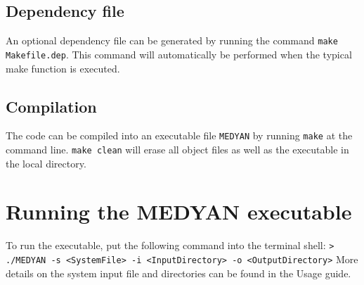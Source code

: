 \documentclass[11pt, oneside]{article}   	%
\begin{document}
	
\subsection {Dependency file}

An optional dependency file can be generated by running the command  \texttt{make Makefile.dep}. This command will automatically be performed when the typical make function is executed.

\subsection{Compilation}

The code can be compiled into an executable file \texttt{MEDYAN} by running \texttt{make} at the command line. \texttt{make clean} will erase all object files as well as the executable in the local directory.

\section {Running the MEDYAN executable}

To run the executable, put the following command into the terminal shell: \newline \newline\indent \texttt{> ./MEDYAN -s <SystemFile> -i <InputDirectory> -o <OutputDirectory>} \newline \newline More details on the system input file and directories can be found in the Usage guide.
\end{document}
